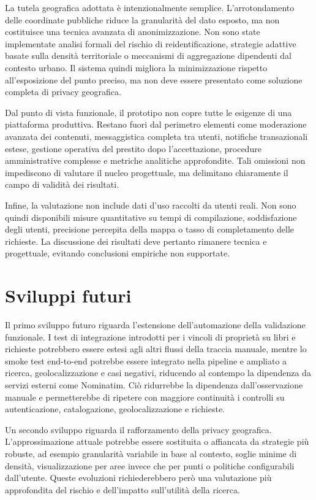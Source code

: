 La tutela geografica adottata è intenzionalmente semplice. L'arrotondamento delle coordinate pubbliche riduce la granularità del dato esposto, ma non costituisce una tecnica avanzata di anonimizzazione. Non sono state implementate analisi formali del rischio di reidentificazione, strategie adattive basate sulla densità territoriale o meccanismi di aggregazione dipendenti dal contesto urbano. Il sistema quindi migliora la minimizzazione rispetto all'esposizione del punto preciso, ma non deve essere presentato come soluzione completa di privacy geografica.

Dal punto di vista funzionale, il prototipo non copre tutte le esigenze di una piattaforma produttiva. Restano fuori dal perimetro elementi come moderazione avanzata dei contenuti, messaggistica completa tra utenti, notifiche transazionali estese, gestione operativa del prestito dopo l'accettazione, procedure amministrative complesse e metriche analitiche approfondite. Tali omissioni non impediscono di valutare il nucleo progettuale, ma delimitano chiaramente il campo di validità dei risultati.

Infine, la valutazione non include dati d'uso raccolti da utenti reali. Non sono quindi disponibili misure quantitative su tempi di compilazione, soddisfazione degli utenti, precisione percepita della mappa o tasso di completamento delle richieste. La discussione dei risultati deve pertanto rimanere tecnica e progettuale, evitando conclusioni empiriche non supportate.

\section{Sviluppi futuri}
\label{sec:sviluppi-futuri}

Il primo sviluppo futuro riguarda l'estensione dell'automazione della validazione funzionale. I test di integrazione introdotti per i vincoli di proprietà su libri e richieste potrebbero essere estesi agli altri flussi della traccia manuale, mentre lo smoke test end-to-end potrebbe essere integrato nella pipeline e ampliato a ricerca, geolocalizzazione e casi negativi, riducendo al contempo la dipendenza da servizi esterni come Nominatim. Ciò ridurrebbe la dipendenza dall'osservazione manuale e permetterebbe di ripetere con maggiore continuità i controlli su autenticazione, catalogazione, geolocalizzazione e richieste.

Un secondo sviluppo riguarda il rafforzamento della privacy geografica. L'approssimazione attuale potrebbe essere sostituita o affiancata da strategie più robuste, ad esempio granularità variabile in base al contesto, soglie minime di densità, visualizzazione per aree invece che per punti o politiche configurabili dall'utente. Queste evoluzioni richiederebbero però una valutazione più approfondita del rischio e dell'impatto sull'utilità della ricerca.

